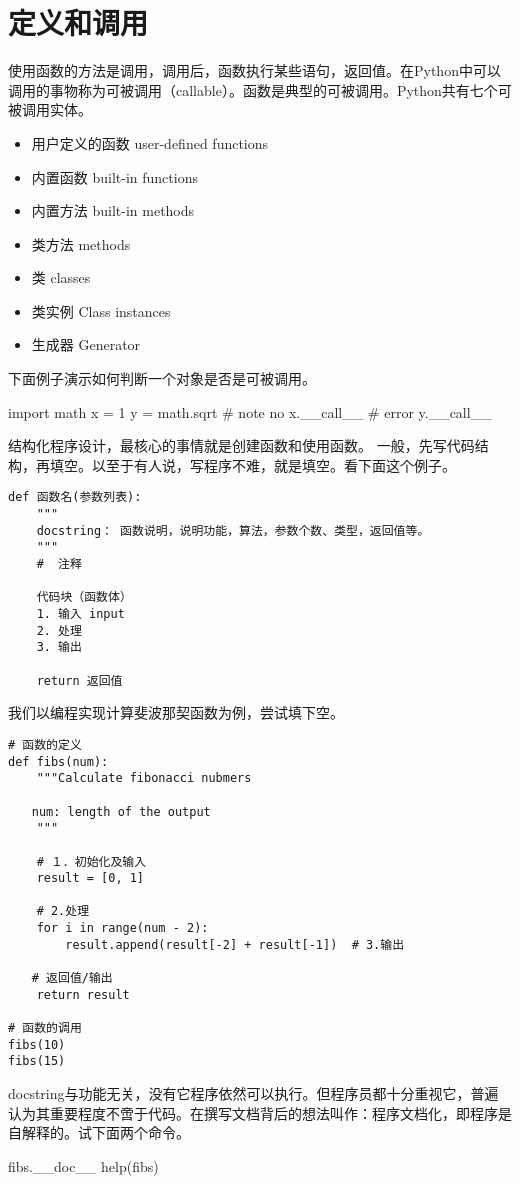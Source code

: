 \section{定义和调用}
使用函数的方法是调用，调用后，函数执行某些语句，返回值。在Python中可以调用的事物称为可被调用（callable）。函数是典型的可被调用。Python共有七个可被调用实体。
\begin{itemize}
\item 用户定义的函数 user-defined functions
\item 内置函数 built-in functions
\item 内置方法 built-in methods
\item 类方法 methods
\item 类 classes
\item 类实例 Class instances 
\item 生成器 Generator
\end{itemize}
下面例子演示如何判断一个对象是否是可被调用。
\begin{python}
import math
x  = 1
y = math.sqrt  # note no
x.__call__ # error
y.__call__
\end{python}
结构化程序设计，最核心的事情就是创建函数和使用函数。 一般，先写代码结构，再填空。以至于有人说，写程序不难，就是填空。看下面这个例子。
\begin{framed}
\begin{verbatim}
def 函数名(参数列表):
    """
    docstring： 函数说明，说明功能，算法，参数个数、类型，返回值等。
    """
    #  注释

    代码块（函数体）
    1. 输入 input
    2. 处理
    3. 输出

    return 返回值
\end{verbatim}
\end{framed}
我们以编程实现计算斐波那契函数为例，尝试填下空。
\begin{framed}
\begin{verbatim}
# 函数的定义
def fibs(num):
    """Calculate fibonacci nubmers

　　num: length of the output
    """

    # １．初始化及输入
    result = [0, 1]

    # 2.处理
    for i in range(num - 2):
        result.append(result[-2] + result[-1])  # 3.输出

　　# 返回值/输出
    return result

# 函数的调用
fibs(10)
fibs(15)
\end{verbatim}
\end{framed}
docstring与功能无关，没有它程序依然可以执行。但程序员都十分重视它，普遍认为其重要程度不啻于代码。在撰写文档背后的想法叫作：程序文档化，即程序是自解释的。试下面两个命令。
\begin{python}
fibs.__doc__
help(fibs)
\end{python}
